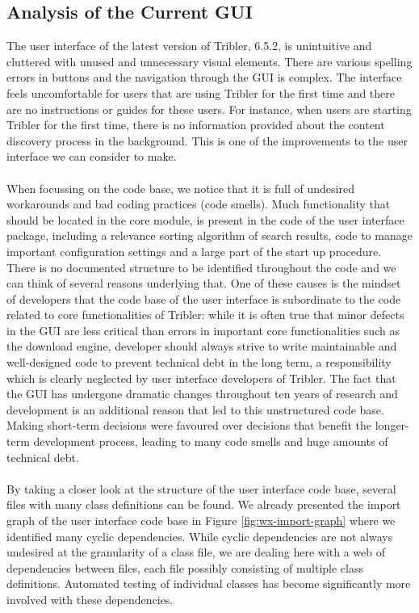 \subsection{Analysis of the Current GUI}
The user interface of the latest version of Tribler, 6.5.2, is unintuitive and cluttered with unused and unnecessary visual elements. There are various spelling errors in buttons and the navigation through the GUI is complex. The interface feels uncomfortable for users that are using Tribler for the first time and there are no instructions or guides for these users. For instance, when users are starting Tribler for the first time, there is no information provided about the content discovery process in the background. This is one of the improvements to the user interface we can consider to make.\\\\
When focussing on the code base, we notice that it is full of undesired workarounds and bad coding practices (code smells). Much functionality that should be located in the core module, is present in the code of the user interface package, including a relevance sorting algorithm of search results, code to manage important configuration settings and a large part of the start up procedure. There is no documented structure to be identified throughout the code and we can think of several reasons underlying that. One of these causes is the mindset of developers that the code base of the user interface is subordinate to the code related to core functionalities of Tribler: while it is often true that minor defects in the GUI are less critical than errors in important core functionalities such as the download engine, developer should always strive to write maintainable and well-designed code to prevent technical debt in the long term, a responsibility which is clearly neglected by user interface developers of Tribler. The fact that the GUI has undergone dramatic changes throughout ten years of research and development is an additional reason that led to this unstructured code base. Making short-term decisions were favoured over decisions that benefit the longer-term development process, leading to many code smells and huge amounts of technical debt.\\\\
By taking a closer look at the structure of the user interface code base, several files with many class definitions can be found. We already presented the import graph of the user interface code base in Figure \ref{fig:wx-import-graph} where we identified many cyclic dependencies. While cyclic dependencies are not always undesired at the granularity of a class file, we are dealing here with a web of dependencies between files, each file possibly consisting of multiple class definitions. Automated testing of individual classes has become significantly more involved with these dependencies.\\\\
